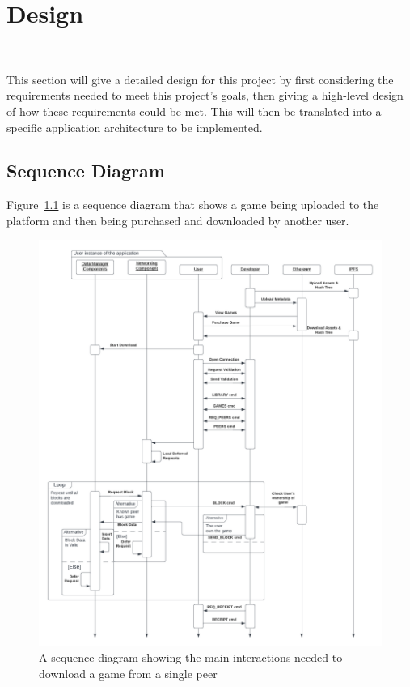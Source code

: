 \chapter{Design}~\label{ch:design}

\noindent
This section will give a detailed design for this project by first considering the requirements needed to meet this project's goals, then giving a high-level design of how these requirements could be met. This will then be translated into a specific application architecture to be implemented. 




\newpage


\newpage
\section{Sequence Diagram}

Figure~\ref{fig:p2p-interactions} is a sequence diagram that shows a game being uploaded to the platform and then being purchased and downloaded by another user.

\begin{figure}[H]
  \centering\hspace{-16.5mm}
  \includegraphics[width=1.1\textwidth]{assets/images/diagrams/p2p-sequence.png}
  \caption{A sequence diagram showing the main interactions needed to download a game from a single peer}
  \label{fig:p2p-interactions}
\end{figure}



